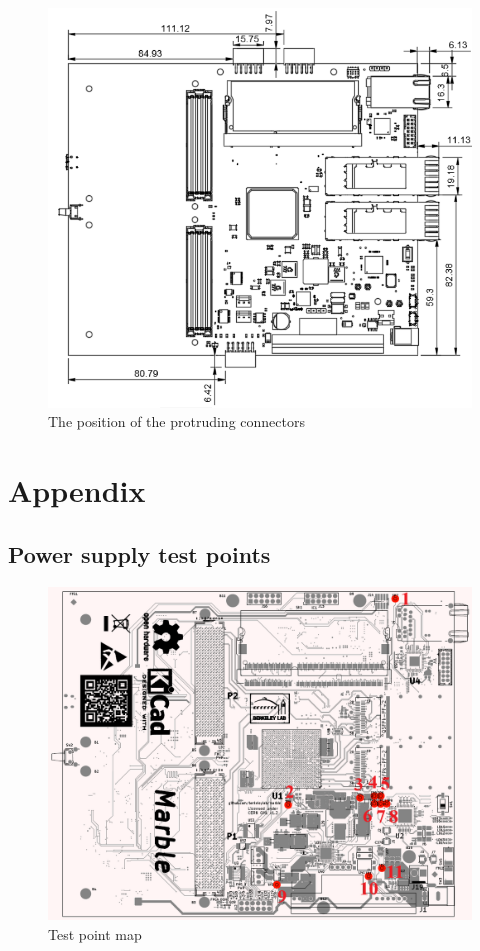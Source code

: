 \documentclass[12pt,oneside,a4]{article}
\begin{document}
\begin{figure}[H]
\begin{center}
\includegraphics[width=1\linewidth]{connectors.png}
 \caption{The position of the protruding connectors}\label{connectors}
\end{center}
\end{figure}

\section{Appendix}
\subsection{Power supply test points}

\begin{figure}[H]
\begin{center}
\includegraphics[width=1\linewidth]{testpointsnumb.png}
 \caption{Test point map}\label{testpoints}
\end{center}
\end{figure}
\end{document}
